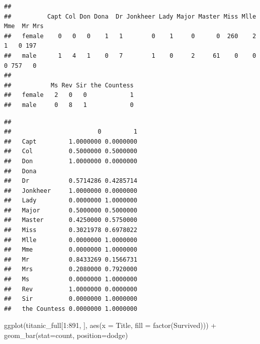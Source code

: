 \documentclass[
]{article}
\newenvironment{Shaded}{\begin{snugshade}}{\end{snugshade}}
\newcommand{\AttributeTok}[1]{\textcolor[rgb]{0.77,0.63,0.00}{#1}}
\newcommand{\DecValTok}[1]{\textcolor[rgb]{0.00,0.00,0.81}{#1}}
\newcommand{\FunctionTok}[1]{\textcolor[rgb]{0.00,0.00,0.00}{#1}}
\newcommand{\NormalTok}[1]{#1}
\newcommand{\SpecialCharTok}[1]{\textcolor[rgb]{0.00,0.00,0.00}{#1}}
\newcommand{\StringTok}[1]{\textcolor[rgb]{0.31,0.60,0.02}{#1}}
\begin{document}
\begin{Shaded}
\end{Shaded}

\begin{verbatim}
##         
##          Capt Col Don Dona  Dr Jonkheer Lady Major Master Miss Mlle Mme  Mr Mrs
##   female    0   0   0    1   1        0    1     0      0  260    2   1   0 197
##   male      1   4   1    0   7        1    0     2     61    0    0   0 757   0
##         
##           Ms Rev Sir the Countess
##   female   2   0   0            1
##   male     0   8   1            0
\end{verbatim}

\begin{Shaded}
\end{Shaded}

\begin{verbatim}
##               
##                        0         1
##   Capt         1.0000000 0.0000000
##   Col          0.5000000 0.5000000
##   Don          1.0000000 0.0000000
##   Dona                            
##   Dr           0.5714286 0.4285714
##   Jonkheer     1.0000000 0.0000000
##   Lady         0.0000000 1.0000000
##   Major        0.5000000 0.5000000
##   Master       0.4250000 0.5750000
##   Miss         0.3021978 0.6978022
##   Mlle         0.0000000 1.0000000
##   Mme          0.0000000 1.0000000
##   Mr           0.8433269 0.1566731
##   Mrs          0.2080000 0.7920000
##   Ms           0.0000000 1.0000000
##   Rev          1.0000000 0.0000000
##   Sir          0.0000000 1.0000000
##   the Countess 0.0000000 1.0000000
\end{verbatim}

\begin{Shaded}
\begin{Highlighting}[]
\FunctionTok{ggplot}\NormalTok{(titanic\_full[}\DecValTok{1}\SpecialCharTok{:}\DecValTok{891}\NormalTok{, ], }\FunctionTok{aes}\NormalTok{(}\AttributeTok{x =}\NormalTok{ Title, }\AttributeTok{fill =} \FunctionTok{factor}\NormalTok{(Survived))) }\SpecialCharTok{+} 
  \FunctionTok{geom\_bar}\NormalTok{(}\AttributeTok{stat=}\StringTok{\textquotesingle{}count\textquotesingle{}}\NormalTok{, }\AttributeTok{position=}\StringTok{\textquotesingle{}dodge\textquotesingle{}}\NormalTok{) }
\end{Highlighting}
\end{Shaded}
\end{document}
